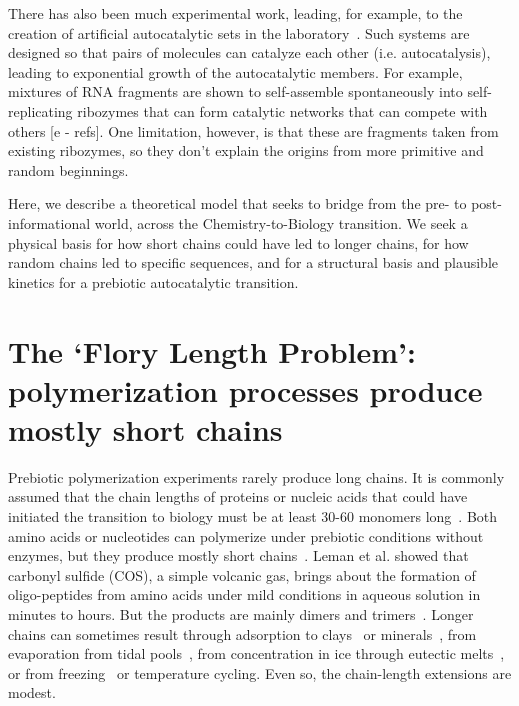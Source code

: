 \documentclass[5p,times]{elsarticle}
\begin{document}
 There has also been much experimental work, leading, for example, to the creation of artificial 
autocatalytic sets in the laboratory~\cite{VonKiedrowski1986,Lincoln2009,Vaidya2012}. Such systems 
are designed so that pairs of molecules can catalyze each other (i.e. autocatalysis), leading to 
exponential growth of the autocatalytic members.  For example, mixtures of RNA fragments are shown 
to self-assemble spontaneously into self-replicating ribozymes that can form catalytic networks 
that can compete with others [e - refs].  One limitation, however, is that these are fragments 
taken from existing ribozymes, so they don't explain the origins from more primitive and random 
beginnings.
 
  Here, we describe a theoretical model that seeks to bridge from the pre- to post-informational 
world, across the Chemistry-to-Biology transition.  We seek a physical basis for how short chains 
could have led to longer chains, for how random chains led to specific sequences, and for a 
structural basis and plausible kinetics for a prebiotic autocatalytic transition.
   
 \section{The `Flory Length Problem': polymerization processes produce mostly short chains}
 \label{sec:flory} 

Prebiotic polymerization experiments rarely produce long chains.  It is commonly assumed that the 
chain lengths of proteins or nucleic acids that could have initiated the transition to biology must 
be at least 30-60 monomers long~\cite{Szostak1993}.  
Both amino acids or nucleotides can polymerize under prebiotic conditions without enzymes, but 
they 
produce mostly short chains~\cite{Shock1992,Martin1998,PAECHT-HOROWITZ1970,Leman2004a,Orgel2004}.  
Leman et al. showed that carbonyl sulfide (COS), a simple volcanic gas, brings about the formation 
of oligo-peptides from amino acids under mild conditions in aqueous solution in minutes to hours. 
But the products are mainly dimers and trimers~\cite{Leman2004a}.  Longer chains can sometimes 
result through adsorption to clays~\cite{Rao1980,Lambert2008} or 
minerals~\cite{Bernal1949,Ferris1996}, from evaporation from tidal pools~\cite{Nelson2001}, from 
concentration in ice through eutectic melts~\cite{Kanavarioti2001}, or from 
freezing~\cite{Bada2004} or temperature cycling.  Even so, the chain-length extensions are modest. 
 
\end{document}
